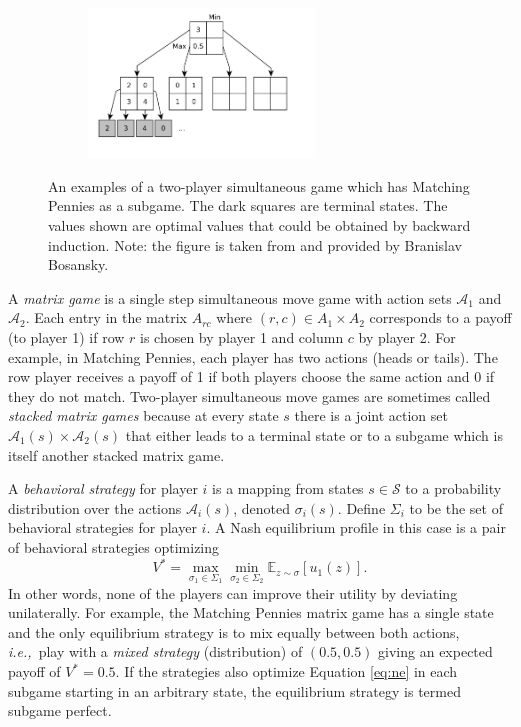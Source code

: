 \documentclass[conference]{IEEEtran}
\newcommand{\bE}{\mathbb{E}}
\newcommand{\cA}{\mathcal{A}}
\newcommand{\cS}{\mathcal{S}}
\newcommand{\ie}{{\it i.e.,}~}
\begin{document}
\begin{figure}[t!]
\centering
\begin{subfigure}{6cm}
\centering
\includegraphics[width=6.0cm]{figures/tree}\\
\end{subfigure}
\caption{An examples of a two-player simultaneous game which has Matching Pennies as a subgame.
The dark squares are terminal states. The values shown are optimal values that could be obtained by backward induction.
{\small Note: the figure is taken from \cite{Lanctot13Goofspiel} and provided by Branislav Bosansky.}
\label{fig:example}}
\end{figure}

A {\it matrix game} is a single step simultaneous move game with action sets $\cA_1$ and $\cA_2$. 
Each entry in the matrix $A_{rc}$ where $(r,c) \in A_1 \times A_2$ corresponds to a payoff (to player 1) if row $r$ is chosen by player 1 and column $c$ by player 2. 
For example, in Matching Pennies, each player has two actions (heads or tails). The row player receives a payoff of 1 if both players choose the same action and 0 if they do not match. 
Two-player simultaneous move games are sometimes called {\it stacked matrix games} because at every state 
$s$ there is a joint action set $\cA_1(s) \times \cA_2(s)$ that either leads to a terminal state or to a subgame which 
is itself another stacked matrix game. 

A {\it behavioral strategy} for player $i$ is a mapping from states $s \in \cS$
to a probability distribution over the actions $\cA_i(s)$, denoted $\sigma_i(s)$. 
Define $\Sigma_i$ to be the set of behavioral 
strategies for player $i$. A Nash equilibrium profile in this case is a pair of behavioral strategies optimizing
\begin{equation}\label{eq:ne}
V^* = \max_{\sigma_1 \in \Sigma_1} \min_{\sigma_2 \in \Sigma_2} \bE_{z \sim \sigma}[u_1(z)].
\end{equation}
In other words, none of the players can improve their utility by deviating unilaterally. 
For example, the Matching Pennies matrix game has a single state and the only equilibrium strategy is to mix equally between both actions, \ie play with a {\it mixed strategy} (distribution) of $(0.5, 0.5)$ giving an expected payoff of $V^* = 0.5$. 
If the strategies also optimize Equation \ref{eq:ne} in each subgame starting in an arbitrary state, the equilibrium strategy is termed subgame perfect.
\end{document}

